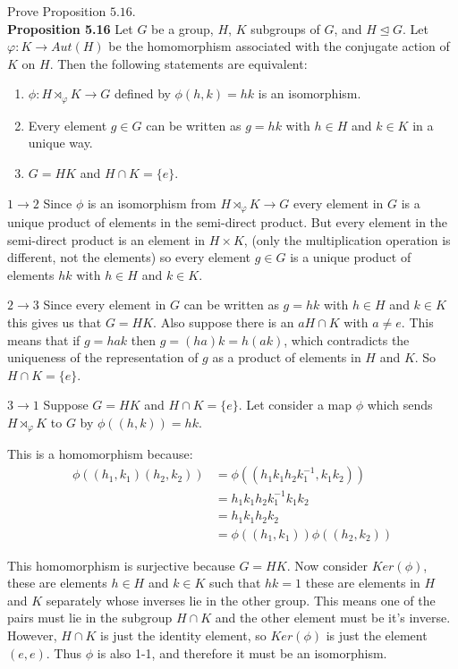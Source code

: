 \documentclass[12pt]{report}
\begin{document}
 Prove Proposition $5.16$.\\

{\bf Proposition 5.16}
Let $G$ be a group, $H$, $K$ subgroups of $G$, and $H \trianglelefteq G$. Let
$\varphi: K \to Aut(H)$ be the homomorphism associated with the conjugate action
 of $K$ on $H$. Then the following statements are equivalent:
\begin{enumerate}
      \item $\phi: H \rtimes_{\varphi} K \to G$ defined by $\phi(h,k) = hk$ is
      an isomorphism.
      \item Every element $g \in G$ can be written as $g = hk$ with $h \in H$
      and $k \in K$ in a unique way.
      \item $G = HK$ and $H \cap K = \{ e\}$.
\end{enumerate}

$1 \to 2$ Since $\phi$ is an isomorphism from $H \rtimes_{\varphi} K \to G$
every element in $G$ is a unique product of elements in the semi-direct product.
But every element in the semi-direct product is an element in $H \times K$,
(only the multiplication operation is different, not the elements) so every
element $g \in G$ is a unique product of elements $hk$ with $h \in H$ and $k \in
K$.

$2 \to 3$ Since every element in $G$ can be written as $g = hk$ with $h \in H$
and $k \in K$ this gives us that $G = HK$. Also suppose there is an $a H \cap K$
with $a \neq e$. This means that if $g = hak$ then $g = (ha)k = h(ak)$, which
contradicts the uniqueness of the representation of $g$ as a product of elements
in $H$ and $K$. So $H \cap K = \{ e\}$.

$3 \to 1$ Suppose $G = HK$ and $H \cap K = \{ e\}$. Let consider a map $\phi$
which sends $H \rtimes_{\varphi} K$ to $G$ by $\phi((h,k)) = hk$.

This is a homomorphism because:
\begin{align*}
\phi((h_1,k_1)(h_2,k_2)) &= \phi((h_1k_1h_2k_1^{-1},k_1k_2))\\
                         &= h_1k_1h_2k_1^{-1}k_1k_2\\
                         &= h_1k_1h_2k_2\\
                         &= \phi((h_1,k_1))\phi((h_2,k_2))
\end{align*}

This homomorphism is surjective because $G = HK$. Now consider $Ker(\phi)$,
these are elements $h \in H$ and $k \in K$ such that $hk = 1$ these are elements
in $H$ and $K$ separately whose inverses lie in the other group. This means one
of the pairs must lie in the subgroup $H \cap K$ and the other element must be
it's inverse. However, $H \cap K$ is just the identity element, so $Ker(\phi)$
is just the element $(e,e)$. Thus $\phi$ is also 1-1, and therefore it must be
an isomorphism.\\
\end{document}
